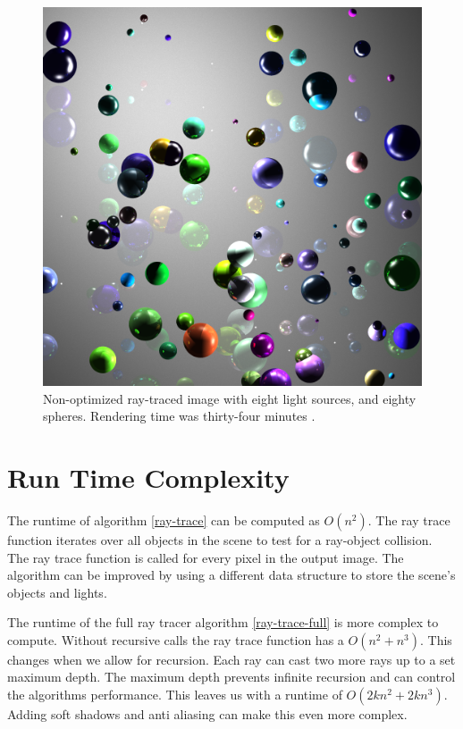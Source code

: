 \documentclass[11pt,a4paper,oneside]{article}
\begin{document}
\begin{figure}[H]
\begin{center}
\includegraphics[scale=0.21]{result1.png} 
\caption{Non-optimized ray-traced image with eight light sources, and eighty spheres.  Rendering time was thirty-four minutes .}
\label{result1}
\end{center}
\end{figure}

\section{Run Time Complexity}
The runtime of algorithm \ref{ray-trace} can be computed as $O(n^2)$.    The ray trace function iterates over all objects in the scene to test for a ray-object collision.  The ray trace function is called for every pixel in the output image.   The algorithm can be improved by using a different data structure to store the scene's objects and lights.

The runtime of the full ray tracer algorithm \ref{ray-trace-full} is more complex to compute.  Without recursive calls the ray trace function has a $O(n^2 + n^3 )$.  This changes when we allow for recursion.  Each ray can cast two more rays up to a set maximum depth.  The maximum depth prevents infinite recursion and can control the algorithms performance.  This leaves us with a runtime of $O(2kn^2+2kn^3)$.  Adding soft shadows and anti aliasing can make this even more complex.
\end{document}
